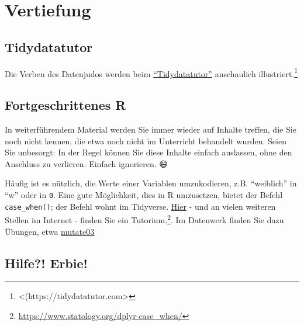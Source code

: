 \documentclass[
  a4paper,
  DIV=11]{scrreprt}
\theoremstyle{definition}
\theoremstyle{definition}
\theoremstyle{definition}
\theoremstyle{remark}
\begin{document}
\section{Vertiefung}\label{vertiefung-3}

\subsection{Tidydatatutor}\label{tidydatatutor}

Die Verben des Datenjudos werden beim
\href{https://tidydatatutor.com/}{``Tidydatatutor''} anschaulich
illustriert.\footnote{\textless(https://tidydatatutor.com\textgreater{}}

\subsection{Fortgeschrittenes R}\label{fortgeschrittenes-r}

\begin{tcolorbox}[enhanced jigsaw, leftrule=.75mm, opacitybacktitle=0.6, colback=white, colframe=quarto-callout-note-color-frame, coltitle=black, colbacktitle=quarto-callout-note-color!10!white, opacityback=0, left=2mm, breakable, titlerule=0mm, toptitle=1mm, bottomtitle=1mm, rightrule=.15mm, title=\textcolor{quarto-callout-note-color}{\faInfo}\hspace{0.5em}{Hinweis}, arc=.35mm, bottomrule=.15mm, toprule=.15mm]

In weiterführendem Material werden Sie immer wieder auf Inhalte treffen,
die Sie noch nicht kennen, die etwa noch nicht im Unterricht behandelt
wurden. Seien Sie unbesorgt: In der Regel können Sie diese Inhalte
einfach auslassen, ohne den Anschluss zu verlieren. Einfach ignorieren.
😄

\end{tcolorbox}

Häufig ist es nützlich, die Werte einer Variablen umzukodieren, z.B.
``weiblich'' in ``w'' oder in \texttt{0}. Eine gute Möglichkeit, dies in
R umzusetzen, bietet der Befehl \texttt{case\_when()}; der Befehl wohnt
im Tidyverse. \href{https://www.statology.org/dplyr-case_when/}{Hier} -
und an vielen weiteren Stellen im Internet - finden Sie ein
Tutorium.\footnote{\url{https://www.statology.org/dplyr-case_when/}}. Im
Datenwerk finden Sie dazu Übungen, etwa
\href{https://datenwerk.netlify.app/posts/mutate03/mutate03.html}{mutate03}

\subsection{Hilfe?! Erbie!}\label{sec-erbie}
\end{document}
